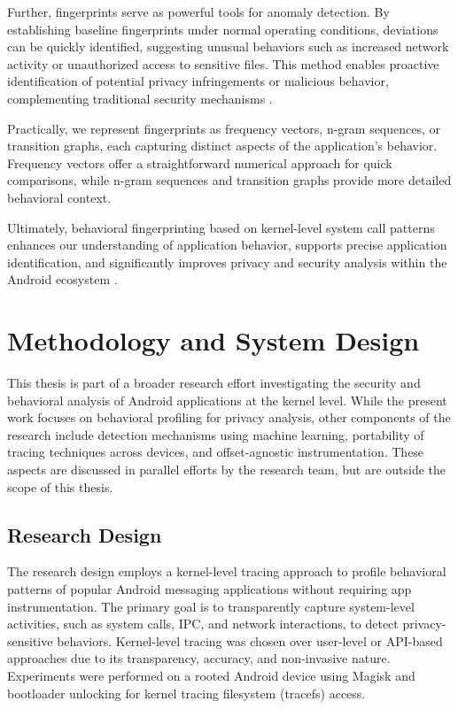 \documentclass[a4paper,12pt]{report}
\begin{document}
Further, fingerprints serve as powerful tools for anomaly detection. By establishing baseline fingerprints under normal operating conditions, deviations can be quickly identified, suggesting unusual behaviors such as increased network activity or unauthorized access to sensitive files. This method enables proactive identification of potential privacy infringements or malicious behavior, complementing traditional security mechanisms \cite{chandola2009anomaly}.

Practically, we represent fingerprints as frequency vectors, n-gram sequences, or transition graphs, each capturing distinct aspects of the application's behavior. Frequency vectors offer a straightforward numerical approach for quick comparisons, while n-gram sequences and transition graphs provide more detailed behavioral context.

Ultimately, behavioral fingerprinting based on kernel-level system call patterns enhances our understanding of application behavior, supports precise application identification, and significantly improves privacy and security analysis within the Android ecosystem \cite{felt2011androidprivacy}.


\chapter{Methodology and System Design}
This thesis is part of a broader research effort investigating the security and behavioral analysis of Android applications at the kernel level. While the present work focuses on behavioral profiling for privacy analysis, other components of the research include detection mechanisms using machine learning, portability of tracing techniques across devices, and offset-agnostic instrumentation. These aspects are discussed in parallel efforts by the research team, but are outside the scope of this thesis.

\section{Research Design}
The research design employs a kernel-level tracing approach to profile behavioral patterns of popular Android messaging applications without requiring app instrumentation. The primary goal is to transparently capture system-level activities, such as system calls, IPC, and network interactions, to detect privacy-sensitive behaviors.
Kernel-level tracing was chosen over user-level or API-based approaches due to its transparency, accuracy, and non-invasive nature. Experiments were performed on a rooted Android device using Magisk and bootloader unlocking for kernel tracing filesystem (tracefs) access.
\end{document}
